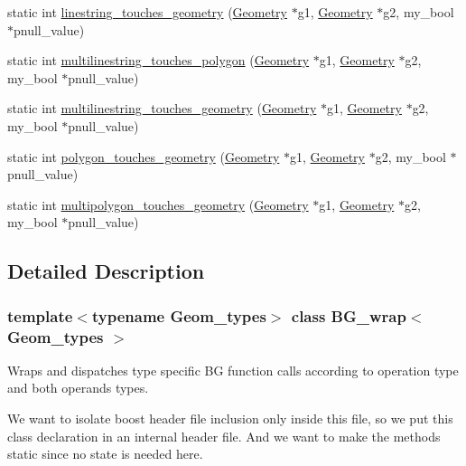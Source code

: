 \begin{DoxyCompactItemize}
\item 
static int \mbox{\hyperlink{classBG__wrap_a81e594fda8d38efa28d8731c56414f39}{linestring\+\_\+touches\+\_\+geometry}} (\mbox{\hyperlink{classGeometry}{Geometry}} $\ast$g1, \mbox{\hyperlink{classGeometry}{Geometry}} $\ast$g2, my\+\_\+bool $\ast$pnull\+\_\+value)
\item 
static int \mbox{\hyperlink{classBG__wrap_ab5996f53d73f7c6838e933cea55e7196}{multilinestring\+\_\+touches\+\_\+polygon}} (\mbox{\hyperlink{classGeometry}{Geometry}} $\ast$g1, \mbox{\hyperlink{classGeometry}{Geometry}} $\ast$g2, my\+\_\+bool $\ast$pnull\+\_\+value)
\item 
static int \mbox{\hyperlink{classBG__wrap_ad484f90db326173f4d947fe35cbc5d59}{multilinestring\+\_\+touches\+\_\+geometry}} (\mbox{\hyperlink{classGeometry}{Geometry}} $\ast$g1, \mbox{\hyperlink{classGeometry}{Geometry}} $\ast$g2, my\+\_\+bool $\ast$pnull\+\_\+value)
\item 
static int \mbox{\hyperlink{classBG__wrap_afa2ed668b6b041b20b518c37ec9aa9d8}{polygon\+\_\+touches\+\_\+geometry}} (\mbox{\hyperlink{classGeometry}{Geometry}} $\ast$g1, \mbox{\hyperlink{classGeometry}{Geometry}} $\ast$g2, my\+\_\+bool $\ast$pnull\+\_\+value)
\item 
static int \mbox{\hyperlink{classBG__wrap_ad1423a08aa8e17b5d873354cc79a2949}{multipolygon\+\_\+touches\+\_\+geometry}} (\mbox{\hyperlink{classGeometry}{Geometry}} $\ast$g1, \mbox{\hyperlink{classGeometry}{Geometry}} $\ast$g2, my\+\_\+bool $\ast$pnull\+\_\+value)
\end{DoxyCompactItemize}


\subsection{Detailed Description}
\subsubsection*{template$<$typename Geom\+\_\+types$>$\newline
class B\+G\+\_\+wrap$<$ Geom\+\_\+types $>$}

Wraps and dispatches type specific BG function calls according to operation type and both operands\textquotesingle{} types.

We want to isolate boost header file inclusion only inside this file, so we put this class declaration in an internal header file. And we want to make the methods static since no state is needed here.



